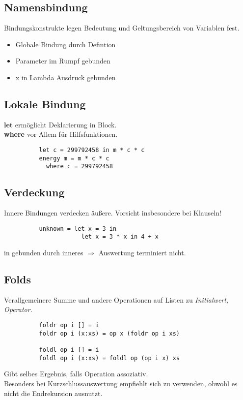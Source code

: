 \subsection{Namensbindung}%
\label{hsk:sub:namensbindung}
Bindungskonstrukte legen Bedeutung und Geltungsbereich von Variablen fest.
\begin{itemize}
  \item Globale Bindung durch Defintion
  \item Parameter im Rumpf gebunden
  \item x in Lambda Ausdruck gebunden
\end{itemize}

\subsection{Lokale Bindung}%
\label{hsk:sub:lokale-bindung}
\textbf{let} ermöglicht Deklarierung in Block.\\
\textbf{where} vor Allem für Hilfsfunktionen.
\begin{lstlisting}
          let c = 299792458 in m * c * c
          energy m = m * c * c
            where c = 299792458
\end{lstlisting}

\subsection{Verdeckung}%
\label{hsk:sub:verdeckung}
Innere Bindungen verdecken äußere.
Vorsicht insbesondere bei  Klauseln!
\begin{lstlisting}
          unknown = let x = 3 in
                      let x = 3 * x in 4 + x
\end{lstlisting}
 in  gebunden durch inneres 
\(\Rightarrow\) Auswertung terminiert nicht.

\subsection{Folds}%
\label{hsk:sub:folds}
Verallgemeinere Summe und andere Operationen auf Listen zu \textit{Initialwert, Operator}.
\begin{lstlisting}
          foldr op i [] = i
          foldr op i (x:xs) = op x (foldr op i xs)

          foldl op i [] = i
          foldl op i (x:xs) = foldl op (op i x) xs
\end{lstlisting}
Gibt selbes Ergebnis, falls Operation assoziativ.\\
Besonders bei Kurzschlussauswertung empfiehlt sich  zu verwenden, obwohl es nicht die Endrekursion ausnutzt.

